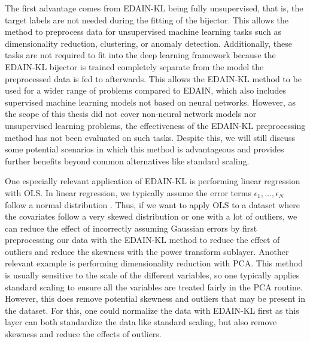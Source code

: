 \documentclass{statsmsc}
\begin{document}
{%
The first advantage comes from \ac{EDAIN-KL} being fully unsupervised, that is,
the target labels are not needed during the fitting of the bijector.  This
allows the method to preprocess data for unsupervised machine learning tasks
such as dimensionality reduction, clustering, or anomaly detection.
Additionally, these tasks are not required to fit into the deep learning
framework because the \ac{EDAIN-KL} bijector is trained completely separate from
the model the preprocessed data is fed to afterwards. This allows the \ac{EDAIN-KL} method to
be used for a wider range of problems compared to \ac{EDAIN}, which also includes supervised
machine learning models not based on neural networks.
However, as the scope of this thesis did not cover non-neural network models
nor unsupervised learning problems, the effectiveness of the \ac{EDAIN-KL}
preprocessing method has not been evaluated on such tasks. Despite this, we will still discuss some
potential scenarios in which this method is advantageous and provides further benefits beyond
common alternatives like standard scaling.

One especially relevant application of \ac{EDAIN-KL} is performing linear regression with
\ac{OLS}. In linear regression, we typically assume the error terms
$\epsilon_1,\dots,\epsilon_N$ follow a normal distribution \citep{wasserman}. Thus, if we want
to apply \ac{OLS} to a dataset where the covariates follow a very skewed distribution or one with
a lot of outliers, we can reduce the effect of incorrectly assuming Gaussian errors by first
preprocessing our data with the \ac{EDAIN-KL} method to reduce the effect of outliers and reduce
the skewness with the power transform sublayer. Another relevant example is
performing dimensionality reduction with \ac{PCA}. This method is usually sensitive to the
scale of the different variables, so one typically applies standard scaling to ensure all the
variables are treated fairly in the \ac{PCA} routine. However, this does remove potential skewness
and outliers that may be present in the dataset. For this, one could normalize the data with
\ac{EDAIN-KL} first as this layer can both standardize the data like standard scaling, but
also remove skewness and reduce the effects of outliers.


}
\end{document}
